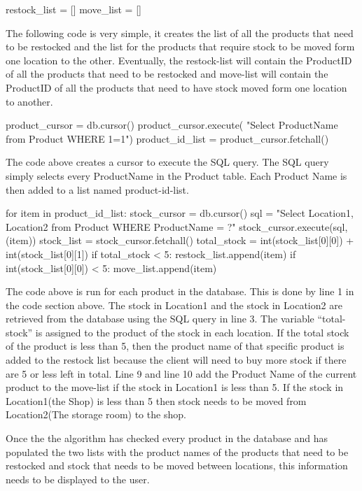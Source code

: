 \begin{python}
restock_list = []
move_list = []
\end{python}

The following code is very simple, it creates the list of all the products that need to be restocked and the list for the products that require stock to be moved form one location to the other. Eventually, the restock-list will contain the ProductID of all the products that need to be restocked and move-list will contain the ProductID of all the products that need to have stock moved form one location to another.


\begin{python}
product_cursor = db.cursor()
product_cursor.execute( "Select ProductName from Product WHERE 1=1")
product_id_list = product_cursor.fetchall()
\end{python}

The code above creates a cursor to execute the SQL query. The SQL query simply selects every ProductName in the Product table. Each Product Name is then added to a list named product-id-list. 

\begin{python}
for item in product_id_list:
            stock_cursor = db.cursor()
            sql = "Select Location1, Location2 from Product WHERE ProductName = ?"
            stock_cursor.execute(sql, (item))
            stock_list = stock_cursor.fetchall()
            total_stock = int(stock_list[0][0]) + int(stock_list[0][1])
            if total_stock < 5:
                restock_list.append(item)
            if int(stock_list[0][0]) < 5:
                move_list.append(item)
\end{python}

The code above is run for each product in the database. This is done by line 1 in the code section above. The stock in Location1 and the stock in Location2 are retrieved from the database using the SQL query in line 3. The variable ``total-stock'' is assigned to the product of the stock in each location. If the total stock of the product is less than 5, then the product name of that specific product is added to the restock list because the client will need to buy more stock if there are 5 or less left in total. Line 9 and line 10 add the Product Name of the current product to the move-list if the stock in Location1 is less than 5. If the stock in Location1(the Shop) is less than 5 then stock needs to be moved from Location2(The storage room) to the shop.

Once the the algorithm has checked every product in the database and has populated the two lists with the product names of the products that need to be restocked and stock that needs to be moved between locations, this information needs to be displayed to the user.

